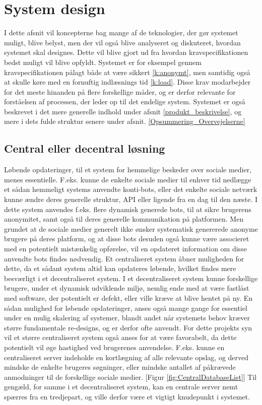 \section{System design}
I dette afsnit vil koncepterne bag mange af de teknologier, der gør systemet muligt, blive belyst, men der vil også blive analyseret og diskuteret, hvordan systemet skal designes. Dette vil blive gjort ud fra hvordan kravspecifikationen bedst muligt vil blive opfyldt.
Systemet er for eksempel gennem kravspecifikationen pålagt både at være sikkert \ref{k:anonymt}, men samtidig også at skulle køre med en fornuftig indlæsnings tid \ref{k:load}. Disse krav modarbejder for det meste hinanden på flere forskellige måder, og er derfor relevante for forståelsen af processen, der leder op til det endelige system. Systemet er også beskrevet i det mere generelle indhold under afsnit \ref{produkt_beskrivelse}, og mere i dets fulde struktur senere under afsnit. \ref{Opsummering_Overvejelserne}

\subsection{Central eller decentral løsning}
\label{Central_De_loesning}
Løbende opdateringer, til et system for hemmelige beskeder over sociale medier, menes essentielle. F.eks. kunne de enkelte sociale medier til enhver tid nedlægge et sådan hemmeligt systems anvendte konti-bots, eller det enkelte sociale netværk kunne ændre deres generelle struktur, API eller ligende fra en dag til den næste.
I dette system anvendes f.eks. flere dynamisk generede bots, til at sikre brugerens anonymitet, samt også til deres generelle kommunikation på platformen. Men grundet at de sociale medier generelt ikke ønsker systematisk genererede anonyme brugere på deres platform, og at disse bots desuden også kunne være associeret med en potentielt mistænkelig opførelse, vil en opdateret information om disse anvendte bots findes nødvendig.
Et centraliseret system åbner muligheden for dette, da et sådant system altid kan opdateres løbende, hvilket findes mere besværligt i et decentraliseret system. I et decentraliseret system kunne forskellige brugere, under et dynamisk udviklende miljø, nemlig ende med at være fastlåst med software, der potentielt er defekt, eller ville kræve at blive hentet på ny.
En sådan mulighed for løbende opdateringer, anses også mange gange for essentiel under en mulig skalering af systemer, blandt andet når systemets behov kræver større fundamentale re-designs, og er derfor ofte anvendt.
For dette projekts syn vil et større centraliseret system også anses for at være favorabelt, da dette potentielt vil øge hastighed ved brugerenes anvendelse. F.eks. kunne en centraliseret server indeholde en kortlægning af alle relevante opslag, og derved mindske de enkelte brugeres søgninger, eller mindske antallet af påkrævede anmodninger til de forskellige sociale medier. [Figur \ref{fig:CentralDatabaseList}]
Til gengæld, for samme i et decentraliseret system, kan en centrale server nemt spærres fra en tredjepart, og ville derfor være et vigtigt knudepunkt i systemet.

